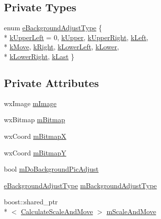 \subsection*{Private Types}
\begin{DoxyCompactItemize}
\item 
enum \hyperlink{a00017_a3927289a3b88bbf9320c2dfe3271c1ae}{e\-Background\-Adjust\-Type} \{ \\*
\hyperlink{a00017_a3927289a3b88bbf9320c2dfe3271c1aea72bd60a19a032bf6ee119dadfa2d3d29}{k\-Upper\-Left} = 0, 
\hyperlink{a00017_a3927289a3b88bbf9320c2dfe3271c1aeabffc7e6bb348a607df81178f547d6e56}{k\-Upper}, 
\hyperlink{a00017_a3927289a3b88bbf9320c2dfe3271c1aeadcf35ed4269172ba63c0e4f69c67358e}{k\-Upper\-Right}, 
\hyperlink{a00017_a3927289a3b88bbf9320c2dfe3271c1aea3b504f62c925ffe2a61686791dfd50ce}{k\-Left}, 
\\*
\hyperlink{a00017_a3927289a3b88bbf9320c2dfe3271c1aea7e36cbc14ee765b91ff48bfb919ef803}{k\-Move}, 
\hyperlink{a00017_a3927289a3b88bbf9320c2dfe3271c1aeac38ecb64d242697f4c7f97a8313d3eb3}{k\-Right}, 
\hyperlink{a00017_a3927289a3b88bbf9320c2dfe3271c1aea1abc7f0f5977ff39029443feed7faa00}{k\-Lower\-Left}, 
\hyperlink{a00017_a3927289a3b88bbf9320c2dfe3271c1aea7fe4ae3c7ccff056364ec92208f9f59b}{k\-Lower}, 
\\*
\hyperlink{a00017_a3927289a3b88bbf9320c2dfe3271c1aea85dacb13f2a7ec3cd034f0979e417a92}{k\-Lower\-Right}, 
\hyperlink{a00017_a3927289a3b88bbf9320c2dfe3271c1aea3a3853b41c9d43cf9f5d761ce167c56c}{k\-Last}
 \}
\end{DoxyCompactItemize}
\subsection*{Private Attributes}
\begin{DoxyCompactItemize}
\item 
wx\-Image \hyperlink{a00017_a121b7518d160cb9253ca79d44441ab57}{m\-Image}
\item 
wx\-Bitmap \hyperlink{a00017_aeeb255c7ec155b17ead559e9302808ec}{m\-Bitmap}
\item 
wx\-Coord \hyperlink{a00017_a9a6be1ca346b8c606143580e25217e98}{m\-Bitmap\-X}
\item 
wx\-Coord \hyperlink{a00017_a45f1e5d433635255d53040a31d778b8e}{m\-Bitmap\-Y}
\item 
bool \hyperlink{a00017_a3573c3aaaa7cab651194764a97e6beb1}{m\-Do\-Background\-Pic\-Adjust}
\item 
\hyperlink{a00017_a3927289a3b88bbf9320c2dfe3271c1ae}{e\-Background\-Adjust\-Type} \hyperlink{a00017_a297fe7a109d02b72f877d598f9d72053}{m\-Background\-Adjust\-Type}
\item 
boost\-::shared\-\_\-ptr\\*
$<$ \hyperlink{a00026}{Calculate\-Scale\-And\-Move} $>$ \hyperlink{a00017_a04635fba985907271247cb8bf1b58bfb}{m\-Scale\-And\-Move}
\end{DoxyCompactItemize}
